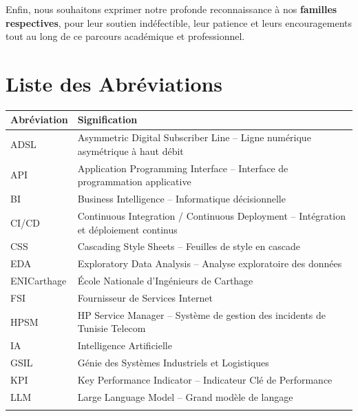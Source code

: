 \documentclass[10pt,a4paper]{report}
\begin{document}
Enfin, nous souhaitons exprimer notre profonde reconnaissance à nos \textbf{familles respectives}, pour leur soutien indéfectible, leur patience et leurs encouragements tout au long de ce parcours académique et professionnel.

\chapter*{Liste des Abréviations}
\thispagestyle{fancy}

\begin{longtable}{L{3cm} L{11.5cm}}
\toprule
{}
\textbf{\color{ttblue}Abréviation} & \textbf{\color{ttblue}Signification} \\
\midrule
\endhead
\bottomrule
\endfoot
ADSL      & Asymmetric Digital Subscriber Line -- Ligne numérique asymétrique à haut débit \\
API       & Application Programming Interface -- Interface de programmation applicative \\
BI        & Business Intelligence -- Informatique décisionnelle \\
CI/CD     & Continuous Integration / Continuous Deployment -- Intégration et déploiement continus \\
CSS       & Cascading Style Sheets -- Feuilles de style en cascade \\
EDA       & Exploratory Data Analysis -- Analyse exploratoire des données \\
ENICarthage & École Nationale d'Ingénieurs de Carthage \\
FSI       & Fournisseur de Services Internet \\
HPSM      & HP Service Manager -- Système de gestion des incidents de Tunisie Telecom \\
IA        & Intelligence Artificielle \\
GSIL      & Génie des Systèmes Industriels et Logistiques \\
KPI       & Key Performance Indicator -- Indicateur Clé de Performance \\
LLM       & Large Language Model -- Grand modèle de langage \\

\end{longtable}
\end{document}
